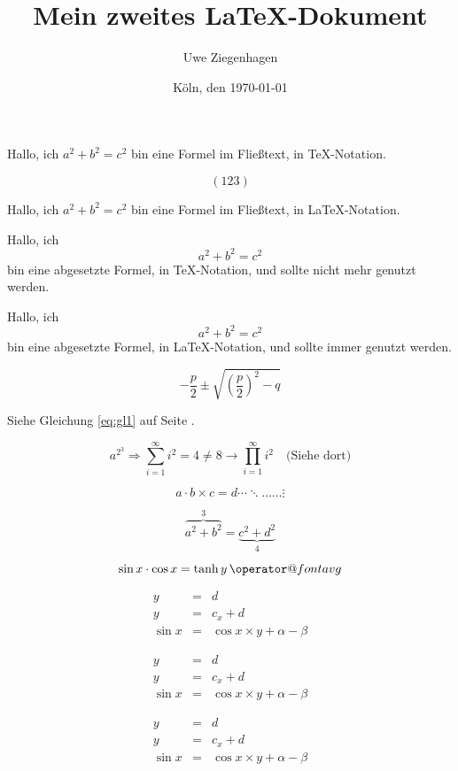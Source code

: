 \documentclass[12pt,ngerman,parskip=half]{scrartcl}
\author{Uwe Ziegenhagen}
\title{Mein zweites \LaTeX-Dokument}
\date{Köln, den \today}
\makeatletter
\newcommand{\avg}{\mathop{\operator@font avg}}
\newcommand{\klammer}[1]{\left(#1\right)}
\makeatother
\begin{document}
Hallo, ich $a^2+b^2=c^2$ bin eine Formel im Fließtext, in \TeX-Notation.

\[ \klammer{ 123 }\]


Hallo, ich \(a^2+b^2=c^2\) bin eine Formel im Fließtext, in \LaTeX-Notation.

Hallo, ich $$a^2+b^2=c^2$$ bin eine abgesetzte Formel, in \TeX-Notation, und sollte nicht mehr genutzt werden.

Hallo, ich \[a^2+b^2=c^2\] bin eine abgesetzte Formel, in \LaTeX-Notation, und sollte immer genutzt werden.

\begin{equation}\label{eq:gl1}%
-\frac{p}{2} \pm \sqrt{
\left(\frac{p}{2}\right)
^2 - q}
\end{equation}

Siehe Gleichung \ref{eq:gl1} auf Seite \pageref{eq:gl1}.

\begin{equation}
a^{2^3} \Rightarrow \sum_{i=1}^{\infty} i^2 = 4 \not=8 \rightarrow \prod_{i=1}^{\infty} i^2 \quad\mbox{(Siehe dort)}
\end{equation}


\begin{equation}
a \cdot b \times c = d \cdots \ddots \ldots \dots \vdots
\end{equation}

\begin{equation}
\overbrace{a^2+b^2}^3 = \underbrace{c^2 + d^2}_4
\end{equation}

\begin{equation}
\sin x \cdot \cos x = \tanh y \avg
\end{equation}

\begin{eqnarray}
y &=& d \\
y &=& c_x +d \\
\sin x &=& \cos x \times y + \alpha - \beta
\end{eqnarray}

\begin{eqnarray*}
y &=& d \\
y &=& c_x +d \\
\sin x &=& \cos x \times y + \alpha - \beta
\end{eqnarray*}

\[
\begin{array}{lcr}
y &=& d \\
y &=& c_x +d \\
\sin x &=& \cos x \times y + \alpha - \beta
\end{array}
\]
\end{document}
